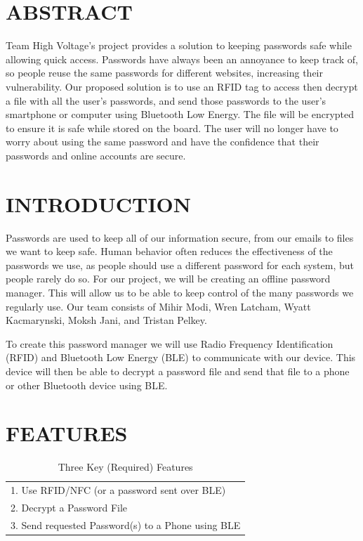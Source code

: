 \documentclass[12pt]{article}
\begin{document}
\tableofcontents
\pagebreak

\section{ABSTRACT}
Team High Voltage's project provides a solution to keeping passwords safe while allowing quick access. Passwords have always been an annoyance to keep track of, so people reuse the same passwords for different websites, increasing their vulnerability. Our proposed solution is to use an RFID tag to access then decrypt a file with all the user's passwords, and send those passwords to the user's smartphone or computer using Bluetooth Low Energy. The file will be encrypted to ensure it is safe while stored on the board. The user will no longer have to worry about using the same password and have the confidence that their passwords and online accounts are secure.  

\section{INTRODUCTION}
Passwords are used to keep all of our information secure, from our emails to files we want to keep safe. Human behavior often reduces the effectiveness of the passwords we use, as people should use a different password for each system, but people rarely do so. For our project, we will be creating an offline password manager. This will allow us to be able to keep control of the many passwords we regularly use. Our team consists of Mihir Modi, Wren Latcham, Wyatt Kacmarynski, Moksh Jani, and Tristan Pelkey.

To create this password manager we will use Radio Frequency Identification (RFID) and Bluetooth Low Energy (BLE) to communicate with our device. This device will then be able to decrypt a password file and send that file to a phone or other Bluetooth device using BLE. 


\section{FEATURES}
\begin{table}[ht]
    \caption{Three Key (Required) Features}
    \label{table:reqFeatures}
    \begin{center}
        \begin{tabular}{|l|}
            \hline
            1. Use RFID/NFC (or a password sent over BLE) \\
            2. Decrypt a Password File \\
            3. Send requested Password(s) to a Phone using BLE \\
            \hline
        \end{tabular}
    \end{center}
\end{table}
\end{document}
